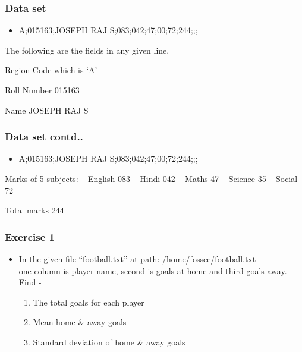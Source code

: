 \documentclass[17pt,compress]{beamer}
\begin{document}
\begin{frame}
\frametitle{Data set}
\label{sec-4.1}

\begin{itemize}
\item A;015163;JOSEPH RAJ S;083;042;47;00;72;244;;;\pause
\end{itemize}

  The following are the fields in any given line.\pause

\begin{itemize}
\begin{small}
\item Region Code which is `A'\pause
\item Roll Number 015163\pause
\item Name JOSEPH RAJ S
\end{small}
\end{itemize}
\end{frame}
\begin{frame}
\frametitle{Data set contd..}
\label{sec-4.2}

\begin{itemize}
\item A;015163;JOSEPH RAJ S;083;042;47;00;72;244;;;\pause
\end{itemize}

\begin{itemize}
\begin{small}
\item Marks of 5 subjects: -- English 083 -- 
     Hindi 042 -- Maths 47 --
     Science 35 -- Social 72\pause
\item Total marks 244
\end{small}
\end{itemize}
\end{frame}
\begin{frame}
\frametitle{Exercise 1}
\label{sec-5}


\begin{itemize}
\item In the given file ``football.txt'' at path: /home/fossee/football.txt\\
    one column is player name, second is goals at home 
    and third goals away. Find -\pause
\vspace{8pt}
\begin{enumerate}
\item The total goals for each player\pause
\item Mean home \& away goals\pause
\item Standard deviation of home \& away goals
\end{enumerate}
\end{itemize}
\end{frame}
\end{document}
